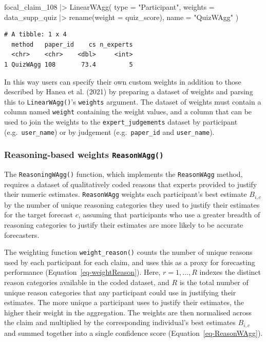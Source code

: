 \documentclass[
  11pt,
  a4paper,
]{article}
\newenvironment{Shaded}{\begin{snugshade}}{\end{snugshade}}
\newcommand{\AttributeTok}[1]{\textcolor[rgb]{0.40,0.45,0.13}{#1}}
\newcommand{\FunctionTok}[1]{\textcolor[rgb]{0.28,0.35,0.67}{#1}}
\newcommand{\NormalTok}[1]{\textcolor[rgb]{0.00,0.23,0.31}{#1}}
\newcommand{\SpecialCharTok}[1]{\textcolor[rgb]{0.37,0.37,0.37}{#1}}
\newcommand{\StringTok}[1]{\textcolor[rgb]{0.13,0.47,0.30}{#1}}
\begin{document}
\begin{Shaded}
\begin{Highlighting}[]
\NormalTok{focal\_claim\_108 }\SpecialCharTok{|\textgreater{}}
  \FunctionTok{LinearWAgg}\NormalTok{(}
    \AttributeTok{type =} \StringTok{"Participant"}\NormalTok{,}
    \AttributeTok{weights =}\NormalTok{ data\_supp\_quiz }\SpecialCharTok{|\textgreater{}}
      \FunctionTok{rename}\NormalTok{(}\AttributeTok{weight =}\NormalTok{ quiz\_score),}
    \AttributeTok{name =} \StringTok{"QuizWAgg"}
\NormalTok{  )}
\end{Highlighting}
\end{Shaded}

\begin{verbatim}
# A tibble: 1 x 4
  method   paper_id    cs n_experts
  <chr>    <chr>    <dbl>     <int>
1 QuizWAgg 108       73.4         5
\end{verbatim}

In this way users can specify their own custom weights in addition to
those described by {Hanea et al.} (2021) by preparing a dataset of
weights and parsing this to \texttt{LinearWAgg()}'s \texttt{weights}
argument. The dataset of weights must contain a column named
\texttt{weight} containing the weight values, and a column that can be
used to join the weights to the \texttt{expert\_judgements} dataset by
participant (e.g.~\texttt{user\_name}) or by judgement
(e.g.~\texttt{paper\_id} and \texttt{user\_name}).

\subsubsection{\texorpdfstring{Reasoning-based weights
\texttt{ReasonWAgg()}}{Reasoning-based weights ReasonWAgg()}}\label{sec-ReasonWAgg}

The \texttt{ReasoningWAgg()} function, which implements the
\texttt{ReasonWAgg} method, requires a dataset of qualitatively coded
reasons that experts provided to justify their numeric estimates.
\texttt{ReasonWAgg} weights each participant's best estimate \(B_{i,c}\)
by the number of unique reasoning categories they used to justify their
estimates for the target forecast \(c\), assuming that participants who
use a greater breadth of reasoning categories to justify their estimates
are more likely to be accurate forecasters.

The weighting function \texttt{weight\_reason()} counts the number of
unique reasons used by each participant for each claim, and uses this as
a proxy for forecasting performance (Equation~\ref{eq-weightReason}).
Here, \(r = 1, \dots, R\) indexes the distinct reason categories
available in the coded dataset, and \(R\) is the total number of unique
reason categories that any participant could use in justifying their
estimates. The more unique a participant uses to justify their
estimates, the higher their weight in the aggregation. The weights are
then normalised across the claim and multiplied by the corresponding
individual's best estimates \(B_{i,c}\) and summed together into a
single confidence score (Equation~\ref{eq-ReasonWAgg}).
\end{document}
